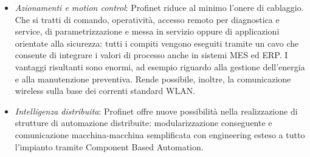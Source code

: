 \documentclass[12pt, a4paper, oneside]{book}
\begin{document}
\begin{itemize}
	\item \textit{Azionamenti e motion control}: Profinet riduce al minimo l'onere di cablaggio. Che si tratti di comando, operatività, accesso remoto per diagnostica e service, di parametrizzazione e messa in servizio oppure di applicazioni orientate alla sicurezza: tutti
	i compiti vengono eseguiti tramite un cavo che consente di integrare i valori di processo anche in sistemi MES ed ERP. I vantaggi risultanti sono enormi, ad esempio riguardo alla gestione dell'energia e alla manutenzione preventiva. Rende possibile, inoltre, la comunicazione wireless sulla base dei correnti standard WLAN. 
	\item \textit{Intelligenza distribuita}: Profinet offre nuove possibilità nella realizzazione di 	strutture di automazione distribuite: modularizzazione conseguente e comunicazione macchina-macchina semplificata con engineering esteso a tutto l'impianto tramite Component Based Automation.
\end{itemize}
\end{document}
